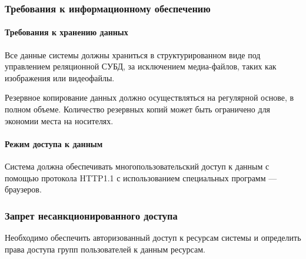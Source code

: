 \subsubsection{Требования к информационному обеспечению}


\paragraph{Требования к хранению данных}
Все данные системы должны храниться в структурированном виде под управлением реляционной СУБД, за исключением медиа-файлов, таких как изображения или видеофайлы.

Резервное копирование данных должно осуществляться на регулярной основе, в полном объеме. Количество резервных копий может быть ограничено для экономии места на носителях.


\paragraph{Режим доступа к данным}

Система должна обеспечивать многопользовательский доступ к данным с помощью протокола HTTP1.1 с использованием специальных программ --- браузеров.


\subsubsection{Запрет несанкционированного доступа}

Необходимо обеспечить авторизованный доступ к ресурсам системы и определить права доступа групп пользователей к данным ресурсам.
